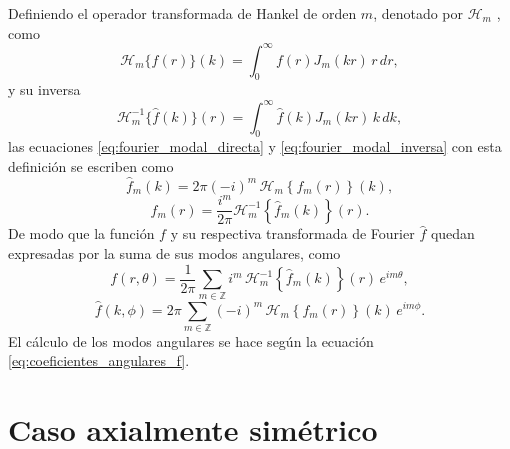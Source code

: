 Definiendo el operador transformada de Hankel de orden $m$, denotado por $\mathscr H_m$ \cite{arfken2013}, como
\begin{equation}
  \mathscr H_m \{ f(r)\}(k) = \int_{0}^{\infty} f(r) J_m(kr)\, r\, dr,
  \label{eq:def_hankel_operator}
\end{equation}
y su inversa
\begin{equation}
  \mathscr H_m^{-1} \{ \hat f(k)\}(r) = \int_{0}^{\infty} \hat f(k) J_m(kr)\, k\, dk,
  \label{eq:def_hankel_inverse_operator}
\end{equation}
las ecuaciones \eqref{eq:fourier_modal_directa} y \eqref{eq:fourier_modal_inversa} con esta definición se escriben como
\begin{equation}
  \hat f_m(k) = 2 \pi (-i)^m\, \mathscr H_m \left\{f_m(r) \right\}(k),
\end{equation}
\begin{equation}
  f_m(r) = \frac{i^m}{2 \pi} \mathscr H_m^{-1} \left\{ \hat f_m(k) \right\}(r).
\end{equation}
De modo que la función $f$ y su respectiva transformada de Fourier $\hat f$ quedan expresadas por la suma de sus modos angulares, como
\begin{equation}
  f(r,\theta) = \frac{1}{2 \pi} \sum_{m \in \mathbb Z} i^m\, \mathscr H_m^{-1} \left\{ \hat f_m(k) \right\}(r)\, e^{im\theta},
\end{equation}
\begin{equation}
  \hat f(k,\phi) = 2 \pi \sum_{m \in \mathbb Z} (-i)^m\, \mathscr H_m \left\{ f_m(r) \right\}(k)\, e^{im\phi}.
\end{equation}
El cálculo de los modos angulares se hace según la ecuación \eqref{eq:coeficientes_angulares_f}.


\section{Caso axialmente simétrico}
\label{subsec:fourier_2d_polar_axial_symmetric}



